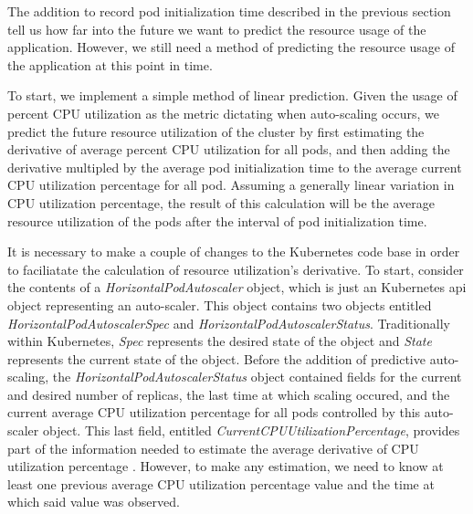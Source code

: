 The addition to record pod initialization time described in the
previous section tell us how far into the future
we want to predict the resource usage of the application. However, we still need
a method of predicting the resource usage of the application at this point in
time.

To start, we implement a simple method of linear prediction. Given the usage of
percent CPU utilization as the metric dictating when auto-scaling occurs, we
predict the future resource utilization of the cluster by first estimating the
derivative of average percent CPU utilization for all pods, and then adding the
derivative multipled by the average pod initialization time to the average current CPU
utilization percentage for all pod. Assuming a generally linear variation in CPU
utilization percentage, the result of this calculation will be the average resource
utilization of the pods after the interval of pod initialization time.

It is necessary to make a couple of changes to the Kubernetes code base in order
to faciliatate the calculation of resource utilization's derivative. To start,
consider the contents of a \textit{HorizontalPodAutoscaler} object, which is
just an Kubernetes api object representing an auto-scaler. This object contains
two objects entitled \textit{HorizontalPodAutoscalerSpec} and
\textit{HorizontalPodAutoscalerStatus}. Traditionally within
Kubernetes, \textit{Spec} represents the desired state of the object and
\textit{State} represents the current state of the object. Before the addition
of predictive auto-scaling, the \textit{HorizontalPodAutoscalerStatus} object
contained fields for the current and desired number of replicas, the last time
at which scaling occured, and the current average CPU utilization percentage for
all pods controlled by this auto-scaler object. This last field, entitled
\textit{CurrentCPUUtilizationPercentage}, provides part of the information
needed to estimate the average derivative of CPU utilization
percentage \cite{k8s-horizontal-pod-autoscaler-object}.
However, to make any estimation, we need to know at least one previous average
CPU utilization percentage value and the time at which said value was
observed.

